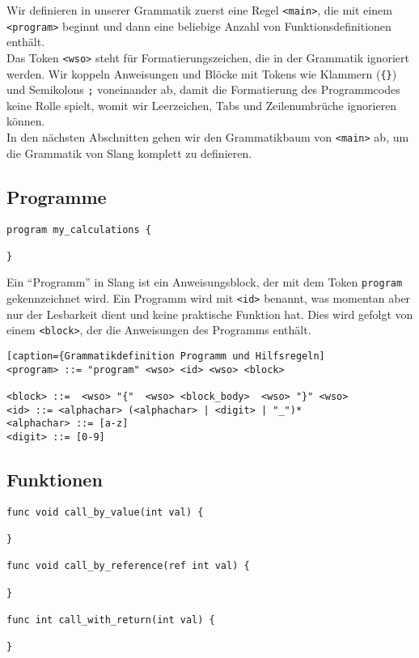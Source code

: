 Wir definieren in unserer Grammatik zuerst eine Regel \texttt{<main>}, die mit einem \texttt{<program>} beginnt und dann eine beliebige Anzahl von Funktionsdefinitionen enthält.\\
Das Token \texttt{<wso>} steht für Formatierungszeichen, die in der Grammatik ignoriert werden.
Wir koppeln Anweisungen und Blöcke mit Tokens wie Klammern (\texttt{\{\}}) und Semikolons \texttt{;} voneinander ab, damit die Formatierung des Programmcodes keine Rolle spielt, womit wir Leerzeichen, Tabs und Zeilenumbrüche ignorieren können.\\
In den nächsten Abschnitten gehen wir den Grammatikbaum von \texttt{<main>} ab, um die Grammatik von Slang komplett zu definieren.\\

\subsection{Programme}

\begin{lstlisting}[caption={Slang Beispiel Programmdeklaration}]
program my_calculations {

}
\end{lstlisting}

Ein ``Programm'' in Slang ist ein Anweisungsblock, der mit dem Token \texttt{program} gekennzeichnet wird.
Ein Programm wird mit \texttt{<id>} benannt, was momentan aber nur der Lesbarkeit dient und keine praktische Funktion hat.
Dies wird gefolgt von einem \texttt{<block>}, der die Anweisungen des Programms enthält.

\begin{lstlisting}[caption={Grammatikdefinition Programm und Hilfsregeln]
<program> ::= "program" <wso> <id> <wso> <block>

<block> ::=  <wso> "{"  <wso> <block_body>  <wso> "}" <wso>
<id> ::= <alphachar> (<alphachar> | <digit> | "_")*
<alphachar> ::= [a-z]
<digit> ::= [0-9]
\end{lstlisting}

\subsection{Funktionen}

\begin{lstlisting}[caption={Slang Beispiel Funktionsdefinitionen}]
func void call_by_value(int val) {

}

func void call_by_reference(ref int val) {

}

func int call_with_return(int val) {

}
\end{lstlisting}

